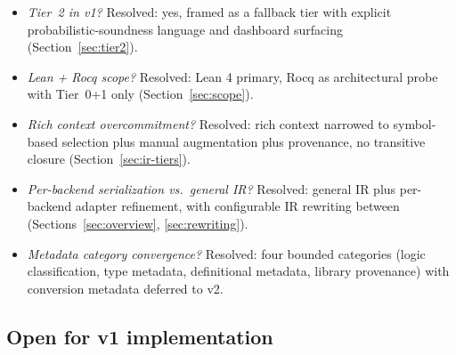 \documentclass[11pt,letterpaper]{article}
\theoremstyle{definition}
\theoremstyle{remark}
\begin{document}
\begin{itemize}[leftmargin=2em]
  \item \emph{Tier~2 in v1?} Resolved: yes, framed as a fallback tier
        with explicit probabilistic-soundness language and dashboard
        surfacing (Section~\ref{sec:tier2}).
  \item \emph{Lean + Rocq scope?} Resolved: Lean 4 primary, Rocq as
        architectural probe with Tier~0+1 only
        (Section~\ref{sec:scope}).
  \item \emph{Rich context overcommitment?} Resolved: rich context
        narrowed to symbol-based selection plus manual augmentation
        plus provenance, no transitive closure
        (Section~\ref{sec:ir-tiers}).
  \item \emph{Per-backend serialization vs.\ general IR?} Resolved:
        general IR plus per-backend adapter refinement, with
        configurable IR rewriting between (Sections~\ref{sec:overview},
        \ref{sec:rewriting}).
  \item \emph{Metadata category convergence?} Resolved: four bounded
        categories (logic classification, type metadata, definitional
        metadata, library provenance) with conversion metadata
        deferred to v2.
\end{itemize}

\subsection{Open for v1 implementation}
\end{document}
